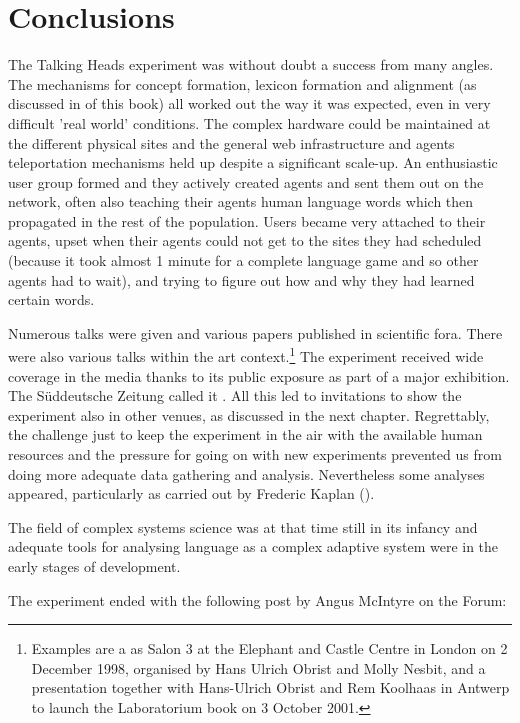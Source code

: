 \section{Conclusions} 

The Talking Heads experiment was without doubt a success from many angles. The mechanisms for concept formation,
lexicon formation and alignment (as discussed in  of this book) all worked out the 
way it was expected, even in very difficult 'real world' conditions. The complex hardware could be maintained at the 
different physical sites and the general web infrastructure and agents teleportation mechanisms held up despite a 
significant scale-up. An enthusiastic user group formed and they actively created agents and sent 
them out on the network, often also teaching their agents human language words which then propagated
in the rest of the population. Users became very attached to their agents, upset when their agents could not get 
to the sites they had scheduled (because it took almost 1 minute for a complete language game and so other agents 
had to wait), and trying to figure out how and why they had learned certain words. 

Numerous talks were given and various papers published in scientific fora. There were also various talks within 
the art context.\footnote{Examples are a  as Salon 3 at the Elephant and Castle Centre
in London on 2 December 1998, organised by Hans Ulrich Obrist and Molly Nesbit, and a presentation together with 
Hans-Ulrich Obrist and Rem Koolhaas in Antwerp to launch the Laboratorium book on 3 October 2001.}
The experiment received wide coverage in 
the media thanks to its public exposure as part of a major exhibition. The Süddeutsche Zeitung called it 
. All this led to invitations to show the experiment
also in other venues, as discussed in the next chapter. 
Regrettably, the challenge just to keep the experiment in the air with the available human resources
and the pressure for going on with new experiments prevented us from doing more adequate data gathering 
and analysis. Nevertheless some analyses appeared, particularly as carried out by Frederic Kaplan (\citealt{Kaplan:2001}). 

The field of complex systems science was at that time still in its infancy and 
adequate tools for analysing language as a complex adaptive system were in the early stages of development. 

The experiment ended with the following  post by Angus McIntyre on the Forum:

